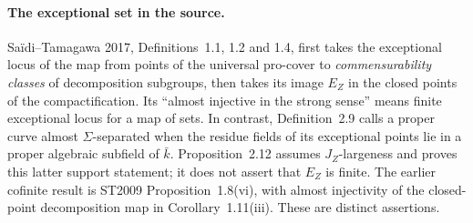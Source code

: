 \documentclass[11pt,a4paper]{article}
\begin{document}
\paragraph{The exceptional set in the source.}
Sa\"idi--Tamagawa 2017, Definitions~1.1, 1.2 and 1.4, first takes
the exceptional locus of the map from points of the universal
pro-cover to \emph{commensurability classes} of decomposition
subgroups, then takes its image $E_Z$ in the closed points of the
compactification. Its ``almost injective in the strong sense'' means
finite exceptional locus for a map of sets. In contrast,
Definition~2.9 calls a proper curve almost $\Sigma$-separated when
the residue fields of its exceptional points lie in a proper
algebraic subfield of $\bar k$. Proposition~2.12 assumes
$J_Z$-largeness and proves this latter support statement; it does
not assert that $E_Z$ is finite. The earlier cofinite result is
ST2009 Proposition~1.8(vi), with almost injectivity of the
closed-point decomposition map in Corollary~1.11(iii).
These are distinct assertions.\citep[Definitions~1.1, 1.2, 1.4,
2.6, 2.9; Proposition~2.12]{LA_ST2017}
\citep[Proposition~1.8(vi), Corollary~1.11]{LA_ST2009}
\end{document}

